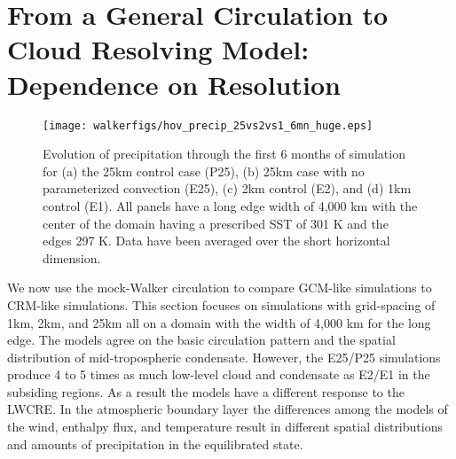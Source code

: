 \documentclass[draft]{agujournal2019}
\begin{document}
{%
\section{From a General Circulation to Cloud Resolving Model: Dependence on Resolution}

\begin{figure}
  \texttt{[image: walkerfigs/hov\_precip\_25vs2vs1\_6mn\_huge.eps]}
  \caption{Evolution of precipitation through the first 6 months of simulation for (a) the 25km control case (P25), 
  (b) 25km case with no parameterized convection (E25), (c) 2km control (E2), and (d) 1km control (E1).  
  All panels have a long edge width of 4,000 km with the center of the domain having a prescribed SST of 301 K and the edges 297 K.  
  Data have been averaged over the short horizontal dimension.} 
  \label{fig:hov_4mods_6mn}
\end{figure}


We now use the mock-Walker circulation to compare GCM-like simulations to CRM-like simulations.  
This section focuses on simulations with grid-spacing of 1km, 2km, and 25km all on a domain with the width of 4,000 km for the long edge.  
The models agree on the basic circulation pattern and the spatial distribution of mid-tropospheric condensate.  
However, the E25/P25 simulations produce 4 to 5 times as much low-level cloud and 
condensate as E2/E1 in the subsiding regions.   As a result the models have a different response 
to the LWCRE.  In the atmospheric boundary layer the differences among the models of the wind, enthalpy flux, and 
temperature result in different spatial distributions and amounts of precipitation in the equilibrated state.  

}
\end{document}
